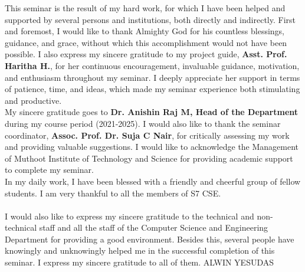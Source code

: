 %
%
This seminar is the result of my hard work, for which I have been helped and supported by several persons and institutions, both directly and indirectly. First and foremost, I would like to thank Almighty God for his countless blessings, guidance, and grace, without which this accomplishment would not have been possible. 
%
I also express my sincere gratitude to my project guide, \textbf{Asst. Prof. Haritha H.}, for her continuous encouragement, invaluable guidance, motivation, and enthusiasm throughout my seminar. I deeply appreciate her support in terms of patience, time, and ideas, which made my seminar experience both stimulating and productive. \\[0.5cm]
%
My sincere gratitude goes to\textbf{ Dr. Anishin Raj M, Head of the Department} during my course period (2021-2025). I would also like to thank the seminar coordinator, \textbf{Assoc. Prof. Dr. Suja C Nair}, for critically assessing my work and providing valuable suggestions. I would like to acknowledge the Management of Muthoot Institute of Technology and Science for providing academic support to complete my seminar.\\[0.5cm]
%
In my daily work, I have been blessed with a friendly and cheerful group of fellow students. I am very thankful to all the members of S7 CSE.\\\\
%
I would also like to express my sincere gratitude to the technical and non-technical staff and all the staff of the Computer Science and Engineering Department for providing a good environment. Besides this, several people have knowingly and unknowingly helped me in the successful completion of this seminar. I express my sincere gratitude to all of them.
%
%
%
\vfill %
\hfill %
ALWIN YESUDAS
%
%
%